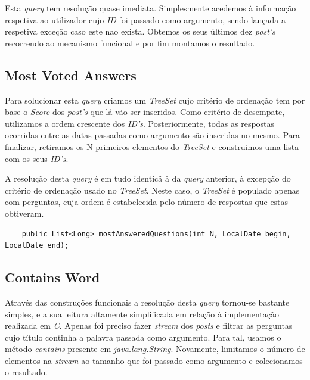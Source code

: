 \documentclass[a4paper, 11pt, oneside]{article}
\begin{document}
Esta \textit{query} tem resolução quase imediata. Simplesmente acedemos à informação respetiva ao utilizador cujo \textit{ID} foi passado como argumento, sendo lançada a respetiva exceção caso este nao exista. Obtemos os seus últimos dez \textit{post's} recorrendo ao mecanismo funcional e por fim montamos o resultado.

\subsection{Most Voted Answers}

Para solucionar esta \textit{query} criamos um \textit{TreeSet} cujo critério de ordenação tem por base o \textit{Score} dos \textit{post's} que lá vão ser inseridos. Como critério de desempate, utilizamos a ordem crescente dos \textit{ID's}. Posteriormente, todas as respostas ocorridas entre as datas passadas como argumento são inseridas no mesmo. Para finalizar, retiramos os N primeiros elementos do \textit{TreeSet} e construimos uma lista com os seus \textit{ID's}.



A resolução desta \textit{query} é em tudo identicâ à da \textit{query} anterior, à excepção do critério de ordenação usado no \textit{TreeSet}. Neste caso, o \textit{TreeSet} é populado apenas com perguntas, cuja ordem é estabelecida pelo número de respostas que estas obtiveram.

\begin{lstlisting}
	public List<Long> mostAnsweredQuestions(int N, LocalDate begin, LocalDate end);
\end{lstlisting}



\subsection{Contains Word}

Através das construções funcionais a resolução desta \textit{query} tornou-se bastante simples, e a sua leitura altamente simplificada em relação à implementação realizada em \textit{C}. Apenas foi preciso fazer \textit{stream} dos \textit{posts} e filtrar as perguntas cujo título continha a palavra passada como argumento. Para tal, usamos o método \textit{contains} presente em \textit{java.lang.String}. Novamente, limitamos o número de elementos na \textit{stream} ao tamanho que foi passado como argumento e colecionamos o resultado.
\end{document}

